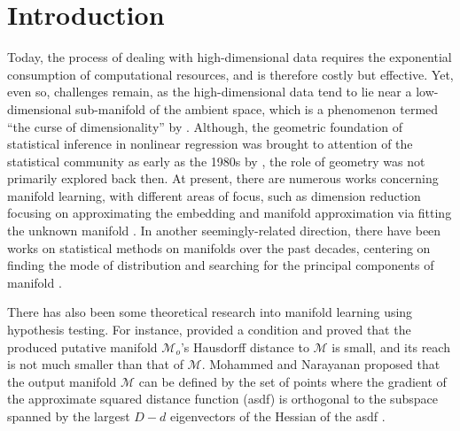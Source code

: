 \documentclass[aos,preprint]{imsart}
\theoremstyle{remark}
\begin{document}

\section{Introduction}

Today, the process of dealing with high-dimensional data requires the exponential consumption of computational resources, and is therefore costly but effective. Yet, even so, challenges remain, as the high-dimensional data tend to lie near a low-dimensional sub-manifold of the ambient space, which is a phenomenon termed ``the curse of dimensionality'' by \cite{fefferman2018fitting}.  Although, the geometric foundation of statistical inference in nonlinear regression was brought to attention of the statistical community as early as the 1980s by \cite{Kass1989}, the role of geometry was not primarily explored back then. At present, there are numerous works concerning manifold learning, with different areas of focus, such as dimension reduction focusing on approximating the embedding \citep{roweis2000nonlinear,zhang2004principal,donoho2003hessian} and manifold approximation via fitting the unknown manifold \citep{genovese2012manifold,chen2015asymptotic,genovese2014nonparametric}. In another seemingly-related direction, there have been works on statistical methods on manifolds over the past decades, centering on finding the mode of distribution \citep{huckemann2010intrinsic,chen2016nonparametric,chen2016comprehensive} and searching for the principal components of manifold \citep{hauberg2015principal,huckemann2006principal,hastie1989principal}.

There has also been some theoretical research into manifold learning using hypothesis testing. For instance, \cite{fefferman2018fitting} provided a condition and proved that the produced putative manifold ${\mathcal M}_o$'s Hausdorff distance to $\mathcal M$ is small, and its reach is not much smaller than that of $\mathcal M$. Mohammed and Narayanan proposed that the output manifold $\mathcal M$ can be defined by the set of points where the gradient of the approximate squared distance function (asdf) is orthogonal to the subspace spanned by the largest $D-d$ eigenvectors of the Hessian of the asdf \cite{mohammed2017manifold}.

\end{document}
